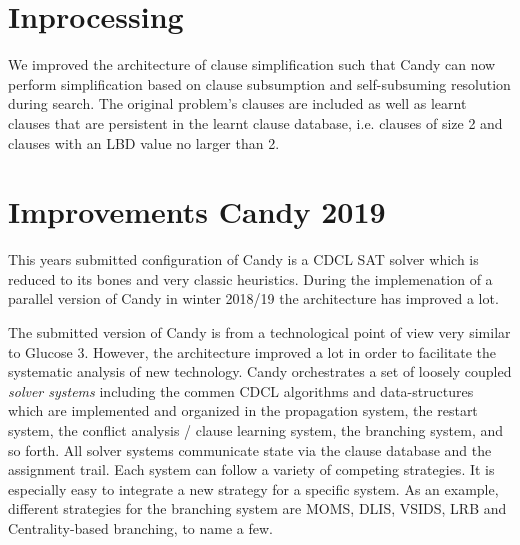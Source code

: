 \documentclass[conference]{IEEEtran}
\begin{document}
\section{Inprocessing}
We improved the architecture of clause simplification such that Candy can now perform simplification based on clause subsumption and self-subsuming resolution during search.
The original problem's clauses are included as well as learnt clauses that are persistent in the learnt clause database, i.e. clauses of size 2 and clauses with an LBD value no larger than 2.


\section{Improvements Candy 2019}
This years submitted configuration of Candy is a CDCL SAT solver which is reduced to its bones and very classic heuristics. 
During the implemenation of a parallel version of Candy in winter 2018/19 the architecture has improved a lot. 

The submitted version of Candy is from a technological point of view very similar to Glucose 3. 
However, the architecture improved a lot in order to facilitate the systematic analysis of new technology. 
Candy orchestrates a set of loosely coupled \emph{solver systems} including the commen CDCL algorithms and data-structures which are implemented and organized in the propagation system, the restart system, the conflict analysis / clause learning system, the branching system, and so forth. 
All solver systems communicate state via the clause database and the assignment trail. 
Each system can follow a variety of competing strategies. 
It is especially easy to integrate a new strategy for a specific system. 
As an example, different strategies for the branching system are MOMS, DLIS, VSIDS, LRB and Centrality-based branching, to name a few. 



%

\end{document}
